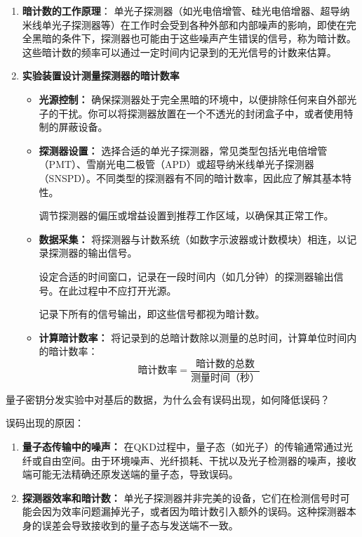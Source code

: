 \documentclass[dvipsnames, svgnames,a4paper,11pt]{article}
\begin{document}
	\begin{enumerate}
		\item \textbf{暗计数的工作原理}：
			单光子探测器（如光电倍增管、硅光电倍增器、超导纳米线单光子探测器等）在工作时会受到各种外部和内部噪声的影响，即使在完全黑暗的条件下，探测器也可能由于这些噪声产生错误的信号，称为暗计数。这些暗计数的频率可以通过一定时间内记录到的无光信号的计数来估算。

		\item \textbf{实验装置设计测量探测器的暗计数率}
			\begin{itemize}
				\item \textbf{光源控制：}
					确保探测器处于完全黑暗的环境中，以便排除任何来自外部光子的干扰。你可以将探测器放置在一个不透光的封闭盒子中，或者使用特制的屏蔽设备。

				\item \textbf{探测器设置：}
					选择合适的单光子探测器，常见类型包括光电倍增管（PMT）、雪崩光电二极管（APD）或超导纳米线单光子探测器（SNSPD）。不同类型的探测器有不同的暗计数率，因此应了解其基本特性。
					
					调节探测器的偏压或增益设置到推荐工作区域，以确保其正常工作。

				\item \textbf{数据采集：}
					将探测器与计数系统（如数字示波器或计数模块）相连，以记录探测器的输出信号。

					设定合适的时间窗口，记录在一段时间内（如几分钟）的探测器输出信号。在此过程中不应打开光源。

					记录下所有的信号输出，即这些信号都视为暗计数。

				\item \textbf{计算暗计数率：}
					将记录到的总暗计数除以测量的总时间，计算单位时间内的暗计数率：
					\[
						\text{暗计数率} = \frac{\text{暗计数的总数}}{\text{测量时间（秒）}}
					\]

			\end{itemize}
	\end{enumerate}







\begin{question}
	量子密钥分发实验中对基后的数据，为什么会有误码出现，如何降低误码？
\end{question}

	误码出现的原因：
	\begin{enumerate}
		\item \textbf{量子态传输中的噪声：}
			在QKD过程中，量子态（如光子）的传输通常通过光纤或自由空间。由于环境噪声、光纤损耗、干扰以及光子检测器的噪声，接收端可能无法精确还原发送端的量子态，导致误码。

		\item \textbf{探测器效率和暗计数：}
			单光子探测器并非完美的设备，它们在检测信号时可能会因为效率问题漏掉光子，或者因为暗计数引入额外的误码。这种探测器本身的误差会导致接收到的量子态与发送端不一致。

	\end{enumerate}
\end{document}
